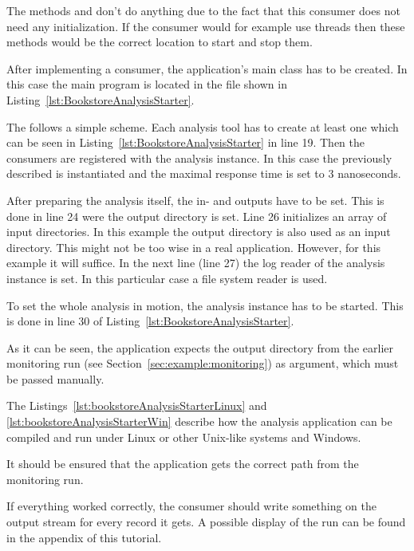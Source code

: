 The methods  and  don't do anything due to the fact that this consumer does not need any initialization. If the consumer would for example use threads then these methods would be the correct location to start and stop them.

After implementing a consumer, the application's main class has to be created. In this case the main program is located in the  file shown in Listing~\ref{lst:BookstoreAnalysisStarter}.

\setJavaCodeListing       


\noindent The  follows a simple scheme. Each analysis tool has to create at least one  which can be seen in Listing~\ref{lst:BookstoreAnalysisStarter} in line 19. Then the consumers are registered with the analysis instance. In this case the previously described  is instantiated and the maximal response time is set to 3 nanoseconds. 

After preparing the analysis itself, the in- and outputs have to be set. This is done in line 24 were the output directory is set. Line 26 initializes an array of input directories. In this example the output directory is also used as an input directory. This might not be too wise in a real application. However, for this example it will suffice. In the next line (line 27) the log reader of the analysis instance is set. In this particular case a file system reader is used.

To set the whole analysis in motion, the analysis instance has to be started. This is done in line 30 of Listing~\ref{lst:BookstoreAnalysisStarter}.

As it can be seen, the application expects the output directory from the earlier monitoring run (see Section~\ref{sec:example:monitoring}) as argument, which must be passed manually. 

The Listings~\ref{lst:bookstoreAnalysisStarterLinux} and \ref{lst:bookstoreAnalysisStarterWin} describe how the analysis application can be compiled and run under Linux or other Unix-like systems and Windows.

\setBashListing 		

	
	

It should be ensured that the application gets the correct path from the monitoring run. 

If everything worked correctly, the consumer should write something on the output stream for every record it gets. A possible display of the run can be found in the appendix of this tutorial. 
